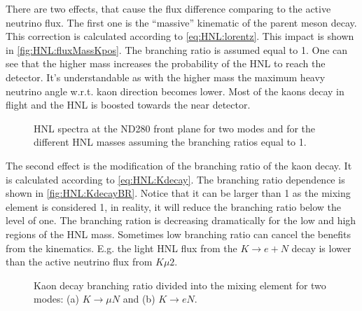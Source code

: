 \documentclass[../main.tex]{subfiles}
\begin{document}
There are two effects, that cause the flux difference comparing to the active neutrino flux. The first one is the ``massive'' kinematic of the parent meson decay. This correction is calculated according to \autoref{eq:HNL:lorentz}. This impact is shown in \autoref{fig:HNL:fluxMassKpos}. The branching ratio is assumed equal to 1. One can see that the higher mass increases the probability of the HNL to reach the detector. It's understandable as with the higher mass the maximum heavy neutrino angle w.r.t. kaon direction becomes lower. Most of the kaons decay in flight and the HNL is boosted towards the near detector.

\begin{figure}[!ht]
    \begin{minipage}{0.49\linewidth}
    \end{minipage}
    \hfill
    \begin{minipage}{0.49\linewidth}
    \end{minipage}
    \caption{HNL spectra at the ND280 front plane for two modes and for the different HNL masses assuming the branching ratios equal to 1.}
    \label{fig:HNL:fluxMassKpos}
\end{figure}

The second effect is the modification of the branching ratio of the kaon decay. It is calculated according to \autoref{eq:HNL:Kdecay}. The branching ratio dependence is shown in \autoref{fig:HNL:KdecayBR}. Notice that it can be larger than 1 as the mixing element is considered 1, in reality, it will reduce the branching ratio below the level of one. The branching ration is decreasing dramatically for the low and high regions of the HNL mass. Sometimes low branching ratio can cancel the benefits from the kinematics. E.g. the light HNL flux from the $K\to e+N$ decay is lower than the active neutrino flux from $K\mu2$.

\begin{figure}[!ht]
    \begin{minipage}[!ht]{0.49\linewidth}
    \end{minipage}
    \hfill
    \begin{minipage}[!ht]{0.49\linewidth}
    \end{minipage}
    \caption{Kaon decay branching ratio divided into the mixing element for two modes: (a) $K\to \mu N$ and (b) $K\to eN$.}
    \label{fig:HNL:KdecayBR}
\end{figure}
\end{document}
